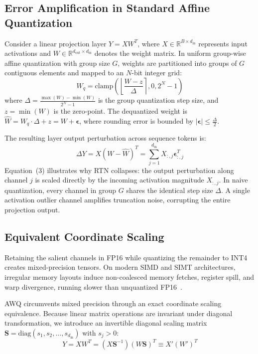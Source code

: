 \documentclass[conference]{IEEEtran}
\begin{document}
\subsection{Error Amplification in Standard Affine Quantization}
Consider a linear projection layer $Y = X W^T$, where $X \in \mathbb{R}^{B \times d_{\text{in}}}$ represents input activations and $W \in \mathbb{R}^{d_{\text{out}} \times d_{\text{in}}}$ denotes the weight matrix. In uniform group-wise affine quantization with group size $G$, weights are partitioned into groups of $G$ contiguous elements and mapped to an $N$-bit integer grid:
\begin{equation}
W_q = \text{clamp}\left( \left\lfloor \frac{W - z}{\Delta} \right\rceil, 0, 2^N - 1 \right)
\end{equation}
where $\Delta = \frac{\max(W) - \min(W)}{2^N - 1}$ is the group quantization step size, and $z = \min(W)$ is the zero-point. The dequantized weight is $\widehat{W} = W_q \cdot \Delta + z = W + \boldsymbol{\epsilon}$, where rounding error is bounded by $|\boldsymbol{\epsilon}| \le \frac{\Delta}{2}$.

The resulting layer output perturbation across sequence tokens is:
\begin{equation}
\Delta Y = X (W - \widehat{W})^T = \sum_{j=1}^{d_{\text{in}}} X_{:, j} \boldsymbol{\epsilon}_{:, j}^T
\end{equation}
Equation~(3) illustrates why RTN collapses: the output perturbation along channel $j$ is scaled directly by the incoming activation magnitude $X_{:, j}$. In naive quantization, every channel in group $G$ shares the identical step size $\Delta$. A single activation outlier channel amplifies truncation noise, corrupting the entire projection output.

\subsection{Equivalent Coordinate Scaling}
Retaining the salient channels in FP16 while quantizing the remainder to INT4 creates mixed-precision tensors. On modern SIMD and SIMT architectures, irregular memory layouts induce non-coalesced memory fetches, register spill, and warp divergence, running slower than unquantized FP16~\cite{park2022nuqmm}.

AWQ circumvents mixed precision through an exact coordinate scaling equivalence. Because linear matrix operations are invariant under diagonal transformation, we introduce an invertible diagonal scaling matrix $\mathbf{S} = \text{diag}(s_1, s_2, \dots, s_{d_{\text{in}}})$ with $s_j > 0$:
\begin{equation}
Y = X W^T = (X \mathbf{S}^{-1}) (W \mathbf{S})^T \equiv X' (W')^T
\end{equation}
\end{document}
